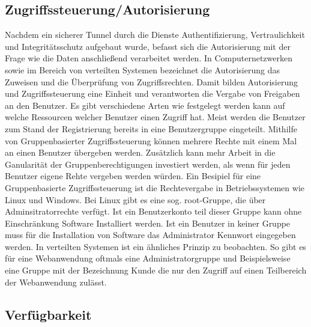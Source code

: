 \documentclass[utf8,biblatex]{lni}
\begin{document}
\subsection{Zugriffssteuerung/Autorisierung}

Nachdem ein sicherer Tunnel durch die Dienste Authentifizierung, Vertraulichkeit und 
Integritätsschutz aufgebaut wurde, befasst sich die Autorisierung mit der Frage wie die Daten 
anschließend verarbeitet werden. 
In Computernetzwerken sowie im Bereich von verteilten Systemen bezeichnet die Autorisierung das Zuweisen 
und die Überprüfung von Zugriffsrechten. Damit bilden Autorisierung und Zugriffssteuerung eine Einheit und 
verantworten die Vergabe von Freigaben an den Benutzer. 
Es gibt verschiedene Arten wie festgelegt werden kann auf welche Ressourcen welcher Benutzer einen Zugriff hat. 
Meist werden die Benutzer zum Stand der Registrierung bereits in eine Benutzergruppe eingeteilt. 
Mithilfe von Gruppenbasierter Zugriffssteuerung können mehrere Rechte mit einem Mal an einen Benutzer übergeben werden. 
Zusätzlich kann mehr Arbeit in die Ganularität der Gruppenberechtigungen investiert werden, als 
wenn für jeden Benutzer eigene Rehte vergeben werden würden. 
Ein Besipiel für eine Gruppenbasierte Zugriffssteuerung ist die Rechtevergabe in Betriebssystemen wie Linux und Windows.
Bei Linux gibt es eine sog. \glqq root\grqq{}-Gruppe, die über Adminsitratorrechte verfügt. Ist ein Benutzerkonto teil dieser Gruppe
kann ohne Einschränkung Software Installiert werden. Ist ein Benutzer in keiner Gruppe muss für die Installation von Software 
das Administrator Kennwort eingegeben werden. 
In verteilten Systemen ist ein ähnliches Prinzip zu beobachten. So gibt es für eine Webanwendung oftmals 
eine Administratorgruppe und Beispielsweise eine Gruppe mit der Bezeichnung \glqq Kunde\grqq{} die nur den Zugriff auf 
einen Teilbereich der Webanwendung zulässt. 

\subsection{Verfügbarkeit}
\end{document}
